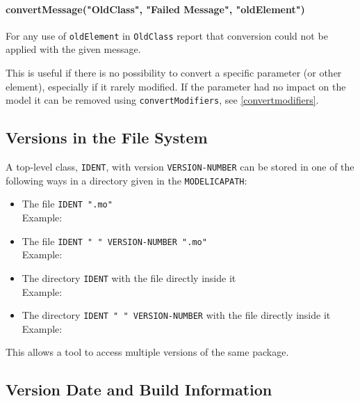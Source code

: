 \paragraph*{convertMessage("OldClass", "Failed Message", "oldElement")}\label{convertmessageoldclass-failed-message2}

For any use of \lstinline!oldElement! in \lstinline!OldClass! report that conversion could not be applied with the given message.

\begin{nonnormative}
This is useful if there is no possibility to convert a specific parameter (or other element), especially if it rarely modified.
If the parameter had no impact on the model it can be removed using \lstinline!convertModifiers!, see \cref{convertmodifiers}.
\end{nonnormative}

\subsection{Versions in the File System}\label{mapping-of-versions-to-file-system}\label{versions-in-the-File-System}

A top-level class, \lstinline!IDENT!, with version \lstinline!VERSION-NUMBER! can be stored in one of the following ways in a directory given in the \lstinline!MODELICAPATH!:
\begin{itemize}
\item
  The file \lstinline!IDENT ".mo"!\\
  Example: 
\item
  The file \lstinline!IDENT " " VERSION-NUMBER ".mo"!\\
  Example: 
\item
  The directory \lstinline!IDENT! with the file  directly inside it\\
  Example: 
\item
  The directory \lstinline!IDENT " " VERSION-NUMBER! with the file  directly inside it\\
  Example: 
\end{itemize}

This allows a tool to access multiple versions of the same package.

\subsection{Version Date and Build Information}\label{version-date-and-build-information}

